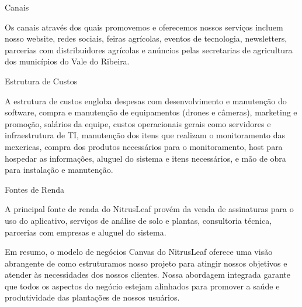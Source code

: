 Canais

Os canais através dos quais promovemos e oferecemos nossos serviços incluem nosso website, redes sociais, feiras agrícolas, eventos de tecnologia, newsletters, parcerias com distribuidores agrícolas e anúncios pelas secretarias de agricultura dos municípios do Vale do Ribeira.

Estrutura de Custos

A estrutura de custos engloba despesas com desenvolvimento e manutenção do software, compra e manutenção de equipamentos (drones e câmeras), marketing e promoção, salários da equipe, custos operacionais gerais como servidores e infraestrutura de TI, manutenção dos itens que realizam o monitoramento das mexericas, compra dos produtos necessários para o monitoramento, host para hospedar as informações, aluguel do sistema e itens necessários, e mão de obra para instalação e manutenção.

Fontes de Renda

A principal fonte de renda do NitrusLeaf provém da venda de assinaturas para o uso do aplicativo, serviços de análise de solo e plantas, consultoria técnica, parcerias com empresas e aluguel do sistema.

Em resumo, o modelo de negócios Canvas do NitrusLeaf oferece uma visão abrangente de como estruturamos nosso projeto para atingir nossos objetivos e atender às necessidades dos nossos clientes. Nossa abordagem integrada garante que todos os aspectos do negócio estejam alinhados para promover a saúde e produtividade das plantações de nossos usuários.